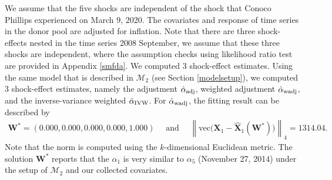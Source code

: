 \documentclass[11pt]{article}
\def\mbf#1{\mathbf{#1}} %
\def\mrm#1{\mathrm{#1}} %
\def\mc#1{\mathcal{#1}} %
\newcommand{\norm}[1]{\left\lVert#1\right\rVert} %
\theoremstyle{definition}
\begin{document}


We assume that the five shocks are independent of the shock that Conoco Phillips experienced on March 9, 2020. The covariates and response of time series in the donor pool are adjusted for inflation. Note that there are three shock-effects nested in the time series 2008 September, we assume that these three shocks are independent, where the assumption checks using likelihood ratio test are provided in Appendix \ref{smfda}. We computed 3 shock-effect estimates. Using the same model that is described in $\mc{M}_{2}$ (see Section \ref{modelsetup}), we computed 3 shock-effect estimates, namely the adjustment  $\hat{\alpha}_{\rm adj}$, weighted adjustment $\hat{\alpha}_{\rm wadj}$, and the inverse-variance weighted $\hat{\alpha}_{\rm IVW}$. For $\hat{\alpha}_{\rm wadj}$, the fitting result can be described by
\begin{align*}
 \mathbf{W}^*= (0.000,0.000, 0.000, 0.000, 1.000) \quad \text{ and } \quad  \norm{\mrm{vec}\big(\mbf{X}_1-\hat{\mbf{X}}_1(\mbf{W}^*)\big)}_{4} = 1314.04.
\end{align*}
Note that the norm is computed using the $k$-dimensional Euclidean metric. The solution $\mathbf{W}^*$ reports that the $\alpha_1$ is very similar to $\alpha_5$ (November 27, 2014) under the setup of $\mc{M}_2$ and our collected covariates. 
\end{document}
